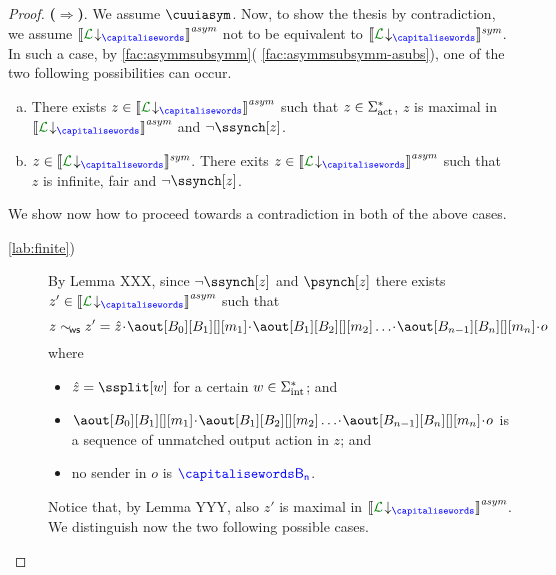 \begin{proof}
%
 {\bf ($\Rightarrow$)}.
 We assume $\cuuiasym$. Now, to show the thesis by contradiction, we assume 
 $\asem{\proj{\clang}{}}$ not to be equivalent to $\ssem{\proj{\clang}{}}$.
 In such a case, by \cref{fac:asymmsubsymm}( \ref{fac:asymmsubsymm-asubs}),
 one of the two following possibilities can occur.
 \begin{enumerate}[a)]
 \item
 \label{lab:finite}
 There exists $z\in \asem{\proj{\clang}{}}$ such that $z\in \Sigma_{\text{act}}^*$, $z$ is maximal in 
 $\asem{\proj{\clang}{}}$ and $\neg\ssynch[z]$.
 \item
  \label{lab:infinite}
   $z\in \ssem{\proj{\clang}{}}$.
 There exits $z\in \asem{\proj{\clang}{}}$ such that $z$ is infinite, fair and $\neg\ssynch[z]$.
 \end{enumerate}
 We show now how to proceed towards a contradiction in both of the above cases.
 \begin{description}
 \item[ \ref{lab:finite})]
 By Lemma XXX, since $\neg\ssynch[z]$ and $\psynch[z]$ there exists 
 $z'\in\asem{\proj{\clang}{}}$ such that 
 $$z\commds z' = \hat z \cat\aout[B_0][B_1][][m_1]\cat\aout[B_1][B_2][][m_2]\ldots\cat\aout[B_{n-1}][B_n][][m_n]\cat o$$
  where
  \begin{itemize}
  \item
 $\hat z = \ssplit[\acword]$ for a certain $w\in\Sigma_{\text{int}}^*$; and 
 \item 
 $\aout[B_0][B_1][][m_1]\cat\aout[B_1][B_2][][m_2]\ldots\cat\aout[B_{n-1}][B_n][][m_n]\cat o$ is a sequence
 of unmatched 
 output action in $z$; and
 \item
 no sender in $o$ is $\ptp[B_n]$.
 \end{itemize}  
 Notice that, by Lemma YYY, also $z'$ is maximal in $\asem{\proj{\clang}{}}$.
 We distinguish now the two following possible cases.\\

\end{description}
\end{proof}
